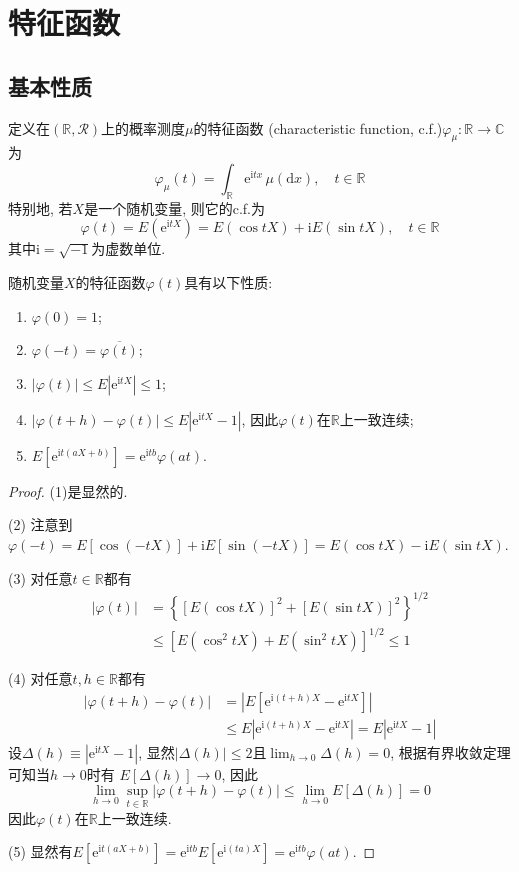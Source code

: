 \documentclass[cn, 12pt, math=mtpro2, bibstyle=apa, blue, twocol]{elegantbook}
\newcommand{\R}{\mathbb{R}}
\begin{document}
\section{特征函数}
\subsection{基本性质}
\begin{definition}
定义在$(\R,\mathcal{R})$上的概率测度$\mu$的特征函数 (characteristic function, c.f.)$\varphi_\mu:\R\to\mathbb{C}$为
$$\varphi_\mu(t)=\int_\R\text{e}^{\text{i}tx}\,\mu(\text{d}x),\quad t\in\R$$
特别地, 若$X$是一个随机变量, 则它的c.f.为
$$\varphi(t)=E(\text{e}^{\text{i}tX})=E(\cos tX)+\text{i}E(\sin tX),\quad t\in\R$$
其中$\text{i}=\sqrt{-1}$为虚数单位.
\end{definition}

\begin{theorem}
随机变量$X$的特征函数$\varphi(t)$具有以下性质:
\begin{enumerate}[label=(\arabic*)]
\item $\varphi(0)=1$;

\item $\varphi(-t)=\overline{\varphi(t)}$;

\item $|\varphi(t)|\leq E|\text{e}^{\text{i}tX}|\leq 1$;

\item $|\varphi(t+h)-\varphi(t)|\leq E|\text{e}^{\text{i}tX}-1|$, 因此$\varphi(t)$在$\R$上一致连续;

\item $E[\text{e}^{\text{i}t(aX+b)}]=\text{e}^{\text{i}tb}\varphi(at)$.
\end{enumerate}
\end{theorem}
\begin{proof}
  (1)是显然的.

  (2) 注意到$\varphi(-t)=E[\cos(-tX)]+\text{i}E[\sin (-tX)]=E(\cos tX)-\text{i}E(\sin tX)$.

  (3) 对任意$t\in\R$都有
  \begin{align*}
  |\varphi(t)|&=\left\{[E(\cos tX)]^2+[E(\sin tX)]^2\right\}^{1/2} \\
  &\leq \left[E(\cos^2 tX)+E(\sin^2 tX)\right]^{1/2}\leq 1
  \end{align*}

  (4) 对任意$t, h\in\R$都有
  \begin{align*}
  |\varphi(t+h)-\varphi(t)|&=|E[\text{e}^{\text{i}(t+h)X}-\text{e}^{\text{i}tX}]| \\
  &\leq E|\text{e}^{\text{i}(t+h)X}-\text{e}^{\text{i}tX}|=E|\text{e}^{\text{i}tX}-1|
  \end{align*}
  设$\Delta(h)\equiv |\text{e}^{\text{i}tX}-1|$, 显然$|\Delta(h)|\leq 2$且$\lim_{h\to0}\Delta(h)=0$, 根据有界收敛定理可知当$h\to0$时有
  $E[\Delta(h)]\to0$, 因此
  $$\lim_{h\to0}\sup_{t\in\R} |\varphi(t+h)-\varphi(t)|\leq\lim_{h\to0}E[\Delta(h)]=0$$
  因此$\varphi(t)$在$\R$上一致连续.

  (5) 显然有$E[\text{e}^{\text{i}t(aX+b)}]=\text{e}^{\text{i}tb}E[\text{e}^{\text{i}(ta)X}]=\text{e}^{\text{i}tb}\varphi(at)$.
\end{proof}
\end{document}
